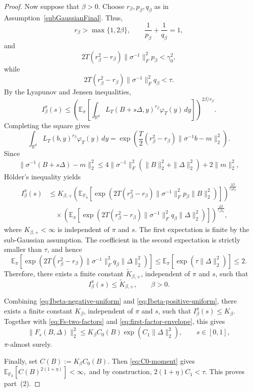 \documentclass[10pt,a4paper]{amsart}
\newcommand{\E}{\mathbb{E}}
\newcommand{\R}{\mathbb{R}}
\begin{document}
\begin{proof}
Now suppose that $\beta>0$. Choose
$r_\beta,p_\beta,q_\beta$ as in
Assumption~\ref{subGaussianFinal}. Thus,
\[
r_\beta>\max\{1,2\beta\},
\qquad
\frac{1}{p_\beta}+\frac{1}{q_\beta}=1,
\]
and
\[
2T(r_\beta^2-r_\beta)
\|\sigma^{-1}\|_F^2p_\beta
<
\gamma_0^2,
\]
while
\[
2T(r_\beta^2-r_\beta)
\|\sigma^{-1}\|_F^2q_\beta
<
\tau.
\]
By the Lyapunov and Jensen inequalities,
\[
I_\beta^\pi(s)
\leq
\left(
\E_\pi
\left[
\int_{\R^d}
L_T(B+s\Delta,y)^{r_\beta}
\varphi_T(y)\,dy
\right]
\right)^{2\beta/r_\beta}.
\]
Completing the square gives
\[
\int_{\R^d}
L_T(b,y)^{r_\beta}
\varphi_T(y)\,dy
=
\exp\!\left(
\frac{T}{2}
(r_\beta^2-r_\beta)
\|\sigma^{-1}b-m\|_2^2
\right).
\]
Since
\[
\|\sigma^{-1}(B+s\Delta)-m\|_2^2
\leq
4\|\sigma^{-1}\|_F^2
\left(
\|B\|_2^2+\|\Delta\|_2^2
\right)
+2\|m\|_2^2,
\]
{H\"older's inequality} yields
\begin{align*}
I_\beta^\pi(s)
&\leq
K_{\beta,+}
\left(
\E_{\mathbb P_0}
\left[
\exp\!\left(
2T(r_\beta^2-r_\beta)
\|\sigma^{-1}\|_F^2p_\beta
\|B\|_2^2
\right)
\right]
\right)^{\frac{2\beta}{r_\beta p_\beta}} \\
&\quad\times
\left(
\E_\pi
\left[
\exp\!\left(
2T(r_\beta^2-r_\beta)
\|\sigma^{-1}\|_F^2q_\beta
\|\Delta\|_2^2
\right)
\right]
\right)^{\frac{2\beta}{r_\beta q_\beta}},
\end{align*}
where $K_{\beta,+}<\infty$ is independent of $\pi$ and $s$.
The first expectation is finite by the sub-Gaussian assumption. The
coefficient in the second expectation is strictly smaller than $\tau$,
and hence
\[
\E_\pi
\left[
\exp\!\left(
2T(r_\beta^2-r_\beta)
\|\sigma^{-1}\|_F^2q_\beta
\|\Delta\|_2^2
\right)
\right]
\leq
\E_\pi
\left[
\exp\!\left(
\tau\|\Delta\|_2^2
\right)
\right]
\leq 2.
\]
Therefore, there exists a finite constant $\widetilde K_{\beta,+}$,
independent of $\pi$ and $s$, such that
\begin{equation}\label{eq:Ibeta-positive-uniform}
I_\beta^\pi(s)
\leq
\widetilde K_{\beta,+},
\qquad
\beta>0.
\end{equation}

Combining \eqref{eq:Ibeta-negative-uniform} and
\eqref{eq:Ibeta-positive-uniform}, there exists a finite constant
$K_\beta$, independent of $\pi$ and $s$, such that $I_\beta^\pi(s)\leq K_\beta.$
Together with \eqref{eq:Fs-two-factors} and
\eqref{eq:first-factor-envelope}, this gives
\[
\|F_s(B,\Delta)\|_2^2
\leq
K_\beta C_0(B)
\exp\!\left(
C_1\|\Delta\|_2^2
\right),
\qquad
s\in[0,1],
\]
$\pi$-almost surely.

Finally, set $C(B):=K_\beta C_0(B).$
Then \eqref{eq:C0-moment} gives $\E_{\mathbb P_0}
\left[
C(B)^{2(1+\eta)}
\right]
<\infty,$
and by construction, $2(1+\eta)C_1<\tau.$
This proves part~(2).
\end{proof}
\end{document}
